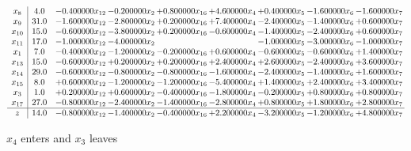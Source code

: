 \documentclass[10pt]{article}
\begin{document}
 \[\begin{array}{c| c c@{\hskip 2pt} c@{\hskip 2pt} c@{\hskip 2pt} c@{\hskip 2pt} c@{\hskip 2pt} c@{\hskip 2pt} c@{\hskip 2pt} }
 x_{8}   &  4.0 & -0.400000 x_{12} & -0.200000 x_{2} & + 0.800000 x_{16} & + 4.600000 x_{4} & + 0.400000 x_{5} & -1.600000 x_{6} & -1.600000 x_{7}\\
 x_{9}   &  31.0 & -1.600000 x_{12} & -2.800000 x_{2} & + 0.200000 x_{16} & + 7.400000 x_{4} & -2.400000 x_{5} & -1.400000 x_{6} & + 0.600000 x_{7}\\
 x_{10}   &  15.0 & -0.600000 x_{12} & -3.800000 x_{2} & + 0.200000 x_{16} & -0.600000 x_{4} & -1.400000 x_{5} & -2.400000 x_{6} & + 0.600000 x_{7}\\
 x_{11}   &  17.0 & -1.000000 x_{12} & -4.000000 x_{2} &    &   & -1.000000 x_{5} & -3.000000 x_{6} & -1.000000 x_{7}\\
 x_{1}   &  7.0 & -0.400000 x_{12} & -1.200000 x_{2} & -0.200000 x_{16} & + 0.600000 x_{4} & -0.600000 x_{5} & -0.600000 x_{6} & + 1.400000 x_{7}\\
 x_{13}   &  15.0 & -0.600000 x_{12} & + 0.200000 x_{2} & + 0.200000 x_{16} & + 2.400000 x_{4} & + 2.600000 x_{5} & -2.400000 x_{6} & + 3.600000 x_{7}\\
 x_{14}   &  29.0 & -0.600000 x_{12} & -0.800000 x_{2} & -0.800000 x_{16} & -1.600000 x_{4} & -2.400000 x_{5} & -1.400000 x_{6} & + 1.600000 x_{7}\\
 x_{15}   &  8.0 & + 0.600000 x_{12} & -1.200000 x_{2} & -1.200000 x_{16} & -5.400000 x_{4} & + 1.400000 x_{5} & + 2.400000 x_{6} & + 3.400000 x_{7}\\
 x_{3}   &  1.0 & + 0.200000 x_{12} & + 0.600000 x_{2} & -0.400000 x_{16} & -1.800000 x_{4} & -0.200000 x_{5} & + 0.800000 x_{6} & + 0.800000 x_{7}\\
 x_{17}   &  27.0 & -0.800000 x_{12} & -2.400000 x_{2} & -1.400000 x_{16} & -2.800000 x_{4} & + 0.800000 x_{5} & + 1.800000 x_{6} & + 2.800000 x_{7}\\
\hline
z    &  14.0 & -0.800000 x_{12} & -1.400000 x_{2} & -0.400000 x_{16} & + 2.200000 x_{4} & -3.200000 x_{5} & -1.200000 x_{6} & + 4.800000 x_{7}\\
\end{array}\]


 $ x_{4} $ enters and $ x_{3} $ leaves 
\end{document}
